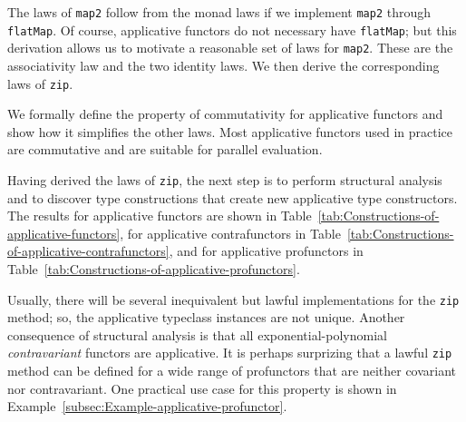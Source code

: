 The laws of \lstinline!map2! follow from the monad laws if we implement
\lstinline!map2! through \lstinline!flatMap!. Of course, applicative
functors do not necessary have \lstinline!flatMap!; but this derivation
allows us to motivate a reasonable set of laws for \lstinline!map2!.
These are the associativity law and the two identity laws. We then
derive the corresponding laws of \lstinline!zip!.

We formally define the property of commutativity for applicative functors
and show how it simplifies the other laws. Most applicative functors
used in practice are commutative and are suitable for parallel evaluation. 

Having derived the laws of \lstinline!zip!, the next step is to perform
structural analysis and to discover type constructions that create
new applicative type constructors. The results for applicative functors
are shown in Table~\ref{tab:Constructions-of-applicative-functors},
for applicative contrafunctors in Table~\ref{tab:Constructions-of-applicative-contrafunctors},
and for applicative profunctors in Table~\ref{tab:Constructions-of-applicative-profunctors}. 

Usually, there will be several inequivalent but lawful implementations
for the \lstinline!zip! method; so, the applicative typeclass instances
are not unique. Another consequence of structural analysis is that
all exponential-polynomial \emph{contravariant} functors are applicative.
It is perhaps surprizing that a lawful \lstinline!zip! method can
be defined for a wide range of profunctors that are neither covariant
nor contravariant. One practical use case for this property is shown
in Example~\ref{subsec:Example-applicative-profunctor}.

